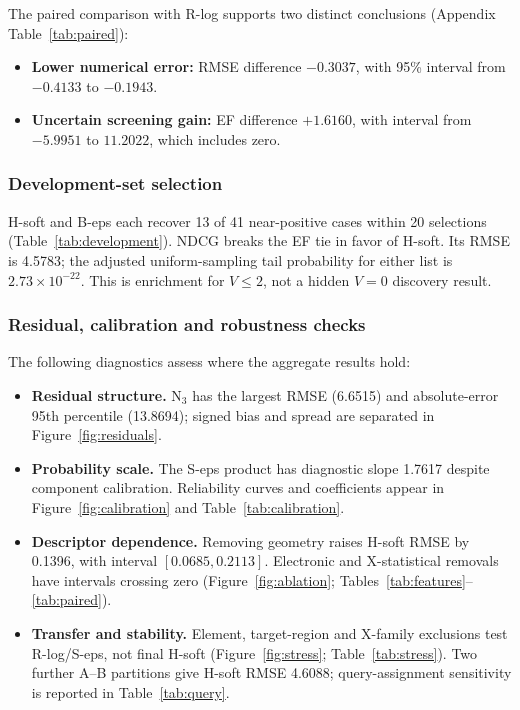 \begin{samepage}
The paired comparison with R-log supports two distinct conclusions (Appendix Table~\ref{tab:paired}):
\begin{itemize}
  \item \textbf{Lower numerical error:} RMSE difference $-0.3037$, with 95\% interval from $-0.4133$ to $-0.1943$.
  \item \textbf{Uncertain screening gain:} EF difference $+1.6160$, with interval from $-5.9951$ to $11.2022$, which includes zero.
\end{itemize}
\end{samepage}

\subsubsection{Development-set selection}
H-soft and B-eps each recover 13 of 41 near-positive cases within 20 selections (Table~\ref{tab:development}). NDCG breaks the EF tie in favor of H-soft. Its RMSE is 4.5783; the adjusted uniform-sampling tail probability for either list is $2.73\times10^{-22}$. This is enrichment for $V\le2$, not a hidden $V=0$ discovery result.


\subsubsection{Residual, calibration and robustness checks}
The following diagnostics assess where the aggregate results hold:
\begin{itemize}
  \item \textbf{Residual structure.} $\mathrm{N_3}$ has the largest RMSE (6.6515) and absolute-error 95th percentile (13.8694); signed bias and spread are separated in Figure~\ref{fig:residuals}.
  \item \textbf{Probability scale.} The S-eps product has diagnostic slope 1.7617 despite component calibration. Reliability curves and coefficients appear in Figure~\ref{fig:calibration} and Table~\ref{tab:calibration}.
  \item \textbf{Descriptor dependence.} Removing geometry raises H-soft RMSE by 0.1396, with interval $[0.0685,0.2113]$. Electronic and X-statistical removals have intervals crossing zero (Figure~\ref{fig:ablation}; Tables~\ref{tab:features}--\ref{tab:paired}).
  \item \textbf{Transfer and stability.} Element, target-region and X-family exclusions test R-log/S-eps, not final H-soft (Figure~\ref{fig:stress}; Table~\ref{tab:stress}). Two further A--B partitions give H-soft RMSE 4.6088; query-assignment sensitivity is reported in Table~\ref{tab:query}.
\end{itemize}
\FloatBarrier

